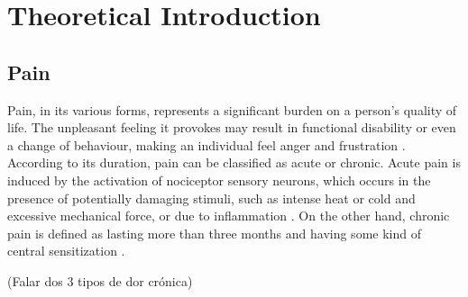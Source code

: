 \chapter{Theoretical Introduction}

\section{Pain}
Pain, in its various forms, represents a significant burden on a person's quality of life. The unpleasant feeling it provokes may result in functional disability or even a change of behaviour, making an individual feel anger and frustration \cite{Dirk2021}. According to its duration, pain can be classified as acute or chronic. Acute pain is induced by the activation of nociceptor sensory neurons, which occurs in the presence of potentially damaging stimuli, such as intense heat or cold and excessive mechanical force, or due to inflammation \cite{Jayakar2021}. On the other hand, chronic pain is defined as lasting more than three months and having some kind of central sensitization \cite{Raman2022}. 

(Falar dos 3 tipos de dor crónica)




